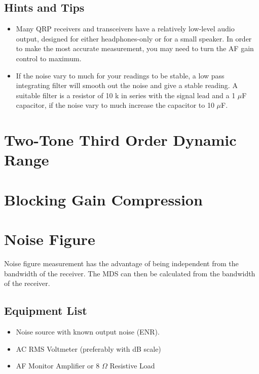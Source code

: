 \documentclass[10pt,letterpaper]{book}
\begin{document}
\subsection*{Hints and Tips}
\begin{itemize}
	\item Many QRP receivers and transceivers have a relatively low-level audio output, designed for either headphones-only or for a small speaker. In order to make the most accurate measurement, you may need to turn the AF gain control to maximum.
	\item If the noise vary to much for your readings to be stable, a low pass integrating filter will smooth out the noise and give a stable reading. A suitable filter is a resistor of 10 k in series with the signal lead and a 1 $\mu$F capacitor, if the noise vary to much increase the capacitor to 10 $\mu$F.  
	
\end{itemize}
\newpage

\section{Two-Tone Third Order Dynamic Range}
\section{Blocking Gain Compression}
\newpage
\section{Noise Figure}
Noise figure measurement has the advantage of being independent from the bandwidth of the receiver. The MDS can then be calculated from the bandwidth of the receiver.
\subsection*{Equipment List}
\begin{itemize}
	\item Noise source with known output noise (ENR).
	\item AC RMS Voltmeter (preferably with dB scale)
	\item AF Monitor Amplifier or 8 $\Omega$ Resistive Load
\end{itemize}
\end{document}
